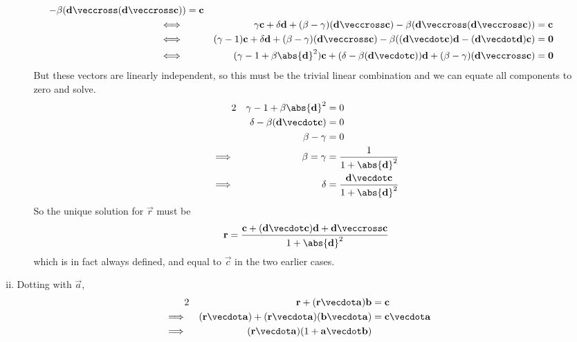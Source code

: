 \documentclass[fleqn,a4paper,11pt]{article}
\begin{document}
\begin{enumerate}
\begin{enumerate}[(i)]
\begin{itemize}
\begin{alignat*}
          - \beta(\vec d \veccross(\vec d \veccross \vec c)) &= \vec c \\
         \iff{}&&
         \gamma \vec c + \delta \vec d
          + (\beta - \gamma)(\vec d \veccross \vec c)
          - \beta(\vec d \veccross(\vec d \veccross \vec c)) &= \vec c \\
         \iff{}&&
         (\gamma - 1) \vec c + \delta \vec d
          + (\beta - \gamma)(\vec d \veccross \vec c)
          - \beta((\vec d \vecdot \vec c)\vec d
                  - (\vec d \vecdot \vec d) \vec c) &= \vec 0 \\
         \iff{}&&
         (\gamma - 1 + \beta\abs{\vec d}^2)\vec c +
         (\delta - \beta(\vec d \vecdot \vec c))\vec d +
         (\beta - \gamma)(\vec d \veccross \vec c) &= \vec 0
        \end{alignat*}
        But these vectors are linearly independent, so this must be the trivial
        linear combination and we can equate all components to zero and solve.
        \begin{alignat*}2
         && \gamma - 1 + \beta \abs{\vec d}^2 &= 0 \\
         && \delta - \beta(\vec d \vecdot \vec c) &= 0 \\
         && \beta - \gamma &= 0 \\
         \implies{}&&
            \beta = \gamma &= \frac 1{1 + \abs{\vec d}^2} \\
         \implies{}&&
            \delta &= \frac{\vec d \vecdot \vec c}{1 + \abs{\vec d}^2}
        \end{alignat*}
        So the unique solution for \(\vec r\) must be
        \begin{equation*}
         \vec r = \frac{\vec c + (\vec d \vecdot \vec c)\vec d
                        + \vec d \veccross \vec c}{1 + \abs{\vec d}^2}
        \end{equation*}
        which is in fact always defined, and equal to \(\vec c\) in the two
        earlier cases.
      \end{itemize}
     \item Dotting with \(\vec a\),
      \begin{alignat*}2
       && \vec r + (\vec r \vecdot \vec a)\vec b &= \vec c \\
       \implies{}&&
        (\vec r \vecdot \vec a)
        + (\vec r \vecdot \vec a)(\vec b \vecdot \vec a)
        &= \vec c \vecdot \vec a \\
       \implies{}&&
        (\vec r \vecdot \vec a)(1 + \vec a \vecdot \vec b)

\end{alignat*}
\end{enumerate}
\end{enumerate}
\end{document}
